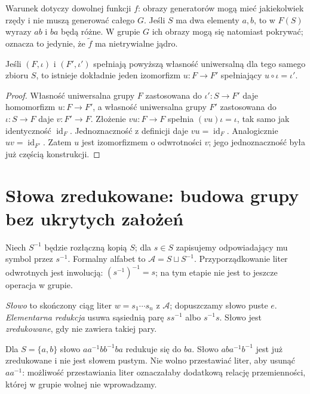 Warunek dotyczy dowolnej funkcji $f$: obrazy generatorów mogą mieć
jakiekolwiek rzędy i nie muszą generować całego $G$. Jeśli $S$ ma
dwa elementy $a,b$, to w $F(S)$ wyrazy $ab$ i $ba$ będą różne.
W grupie $G$ ich obrazy mogą się natomiast pokrywać; oznacza to
jedynie, że $\widetilde f$ ma nietrywialne jądro.

\begin{lemat}
\label{aa:lem:free-unique}
Jeśli $(F,\iota)$ i $(F',\iota')$ spełniają powyższą własność
uniwersalną dla tego samego zbioru $S$, to istnieje dokładnie jeden
izomorfizm $u:F\to F'$ spełniający $u\circ\iota=\iota'$.
\end{lemat}
\begin{proof}
Własność uniwersalna grupy $F$ zastosowana do $\iota':S\to F'$ daje
homomorfizm $u:F\to F'$, a własność uniwersalna grupy $F'$ zastosowana
do $\iota:S\to F$ daje $v:F'\to F$.
Złożenie $vu:F\to F$ spełnia $(vu)\iota=\iota$,
tak samo jak identyczność $\operatorname{id}_F$. Jednoznaczność
z definicji daje $vu=\operatorname{id}_F$.
Analogicznie $uv=\operatorname{id}_{F'}$.
Zatem $u$ jest izomorfizmem o odwrotności $v$;
jego jednoznaczność była już częścią konstrukcji.
\end{proof}

\section{Słowa zredukowane: budowa grupy bez ukrytych założeń}
Niech $S^{-1}$ będzie rozłączną kopią $S$; dla $s\in S$ zapisujemy
odpowiadający mu symbol przez $s^{-1}$. Formalny alfabet to
$\mathcal A=S\sqcup S^{-1}$. Przyporządkowanie liter odwrotnych
jest inwolucją: $(s^{-1})^{-1}=s$; na tym etapie nie jest to jeszcze
operacja w grupie.

\begin{definicja}
\label{aa:def:free-word}
\emph{Słowo} to skończony ciąg liter $w=s_1\cdots s_n$ z $\mathcal A$;
dopuszczamy słowo puste $e$. \emph{Elementarna redukcja} usuwa
sąsiednią parę $ss^{-1}$ albo $s^{-1}s$.
Słowo jest \emph{zredukowane}, gdy nie zawiera takiej pary.
\end{definicja}

\begin{przyklad}
\label{aa:prz:free-reduction}
Dla $S=\{a,b\}$ słowo $a a^{-1} b b^{-1} b a$ redukuje się
do $ba$. Słowo $aba^{-1}b^{-1}$ jest już zredukowane i nie jest
słowem pustym. Nie wolno przestawiać liter, aby usunąć $aa^{-1}$:
możliwość przestawiania liter oznaczałaby dodatkową relację
przemienności, której w grupie wolnej nie wprowadzamy.
\end{przyklad}

